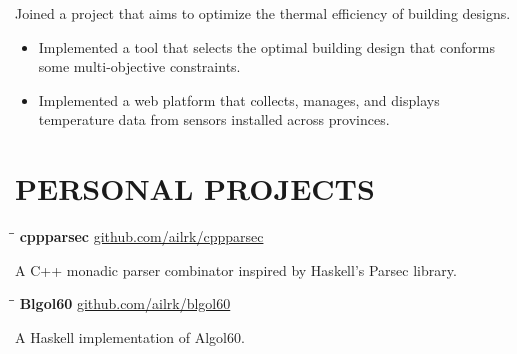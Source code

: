 \documentclass{resume}
\begin{document}
    Joined a project that aims to optimize the thermal efficiency of building designs.

    \begin{itemize}
        \item Implemented a tool that selects the optimal building design that conforms some multi-objective constraints.

        \item Implemented a web platform that collects, manages, and displays temperature data from sensors installed across provinces.
    \end{itemize}

     \vspace{-0.1in}

\section{PERSONAL PROJECTS}

    \begin{tabbing}
        \hspace{2.4in}\= \hspace{2in}\= \kill
        {\bf cppparsec } \>               \>\url{github.com/ailrk/cppparsec}\\
    \end{tabbing}

    \vspace{-0.3in}
    A C++ monadic parser combinator inspired by Haskell's Parsec library.
    \vspace{-0.15in}

    \begin{tabbing}
        \hspace{2.4in}\= \hspace{2in}\= \kill
        {\bf Blgol60 } \>               \>\url{github.com/ailrk/blgol60}\\

    \end{tabbing}
    \vspace{-0.3in}
    A Haskell implementation of Algol60.
    \vspace{-0.1in}
\end{document}

